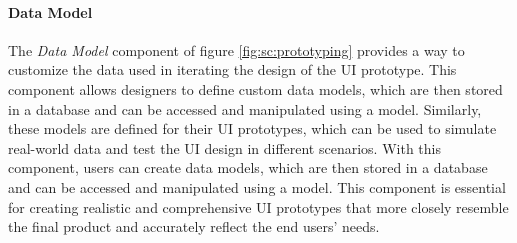 \paragraph{Data Model}
The \textit{Data Model} component of figure \ref{fig:sc:prototyping} provides a way to customize the data used in iterating the design of the UI prototype. 
This component allows designers to define custom data models, which are then stored in a database and can be accessed and manipulated using a model.  
Similarly, these models are defined for their UI prototypes, which can be used to simulate real-world data and test the UI design in different scenarios. 
With this component, users can create data models, which are then stored in a database and can be accessed and manipulated using a model. 
This component is essential for creating realistic and comprehensive UI prototypes that more closely resemble the final product and accurately reflect the end users' needs.


